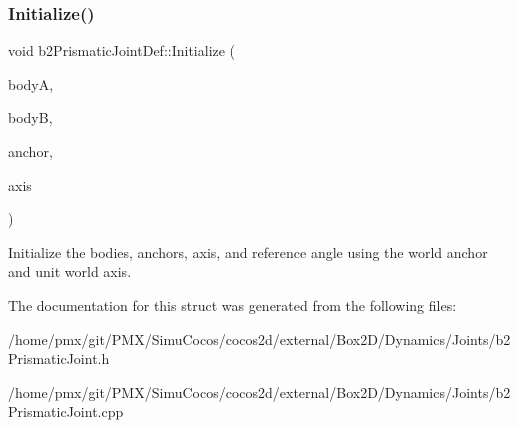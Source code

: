 \subsubsection{\texorpdfstring{Initialize()}{Initialize()}\hspace{0.1cm}{\footnotesize\ttfamily [2/2]}}
{\footnotesize\ttfamily void b2\+Prismatic\+Joint\+Def\+::\+Initialize (\begin{DoxyParamCaption}\item[{\hyperlink{classb2Body}{b2\+Body} $\ast$}]{bodyA,  }\item[{\hyperlink{classb2Body}{b2\+Body} $\ast$}]{bodyB,  }\item[{const \hyperlink{structb2Vec2}{b2\+Vec2} \&}]{anchor,  }\item[{const \hyperlink{structb2Vec2}{b2\+Vec2} \&}]{axis }\end{DoxyParamCaption})}

Initialize the bodies, anchors, axis, and reference angle using the world anchor and unit world axis. 

The documentation for this struct was generated from the following files\+:\begin{DoxyCompactItemize}
\item 
/home/pmx/git/\+P\+M\+X/\+Simu\+Cocos/cocos2d/external/\+Box2\+D/\+Dynamics/\+Joints/b2\+Prismatic\+Joint.\+h\item 
/home/pmx/git/\+P\+M\+X/\+Simu\+Cocos/cocos2d/external/\+Box2\+D/\+Dynamics/\+Joints/b2\+Prismatic\+Joint.\+cpp\end{DoxyCompactItemize}
